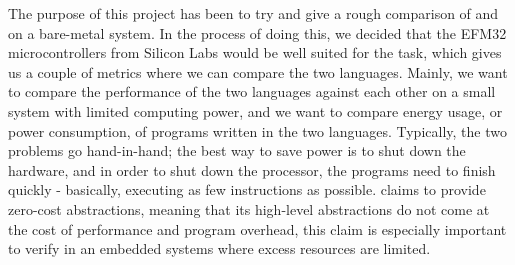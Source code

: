 The purpose of this project has been to try and give a rough comparison of {\rust} and {\C} on a bare-metal system.
In the process of doing this, we decided that the EFM32 microcontrollers from Silicon Labs would be well suited for the task, which gives us a couple of metrics where we can compare the two languages.
Mainly, we want to compare the performance of the two languages against each other on a small system with limited computing power, and we want to compare energy usage, or power consumption, of programs written in the two languages.
Typically, the two problems go hand-in-hand; the best way to save power is to shut down the hardware, and in order to shut down the processor, the programs need to finish quickly - basically, executing as few instructions as possible.
{\rust} claims to provide zero-cost abstractions, meaning that its high-level abstractions do not come at the cost of performance and program overhead, this claim is especially important to verify in an embedded systems where excess resources are limited.







